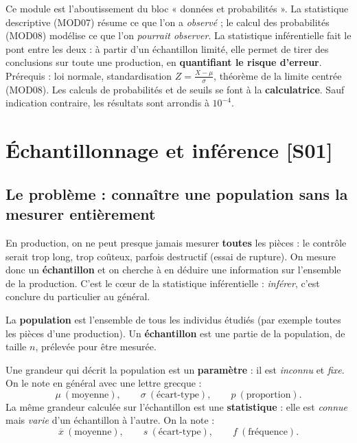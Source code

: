 \documentclass[a4paper,11pt]{article}
\begin{document}
\begin{remarque}
Ce module est l'aboutissement du bloc « données et probabilités ». La statistique descriptive (MOD07) résume ce que l'on a \emph{observé} ; le calcul des probabilités (MOD08) modélise ce que l'on \emph{pourrait observer}. La statistique inférentielle fait le pont entre les deux : à partir d'un échantillon limité, elle permet de tirer des conclusions sur toute une production, en \textbf{quantifiant le risque d'erreur}. Prérequis : loi normale, standardisation $Z = \frac{X-\mu}{\sigma}$, théorème de la limite centrée (MOD08). Les calculs de probabilités et de seuils se font à la \textbf{calculatrice}. Sauf indication contraire, les résultats sont arrondis à $10^{-4}$.
\end{remarque}

\newpage
\tableofcontents
\newpage

\section{Échantillonnage et inférence \hfill {\normalsize\color{uimmred}[S01]}}

\subsection{Le problème : connaître une population sans la mesurer entièrement}

En production, on ne peut presque jamais mesurer \textbf{toutes} les pièces : le contrôle serait trop long, trop coûteux, parfois destructif (essai de rupture). On mesure donc un \textbf{échantillon} et on cherche à en déduire une information sur l'ensemble de la production. C'est le cœur de la statistique inférentielle : \emph{inférer}, c'est conclure du particulier au général.

\begin{definition}
La \textbf{population} est l'ensemble de tous les individus étudiés (par exemple toutes les pièces d'une production). Un \textbf{échantillon} est une partie de la population, de taille $n$, prélevée pour être mesurée.

Une grandeur qui décrit la population est un \textbf{paramètre} : il est \emph{inconnu} et \emph{fixe}. On le note en général avec une lettre grecque :
\[
\mu \ (\text{moyenne}), \qquad \sigma \ (\text{écart-type}), \qquad p \ (\text{proportion}).
\]
La même grandeur calculée sur l'échantillon est une \textbf{statistique} : elle est \emph{connue} mais \emph{varie} d'un échantillon à l'autre. On la note :
\[
\overline{x} \ (\text{moyenne}), \qquad s \ (\text{écart-type}), \qquad f \ (\text{fréquence}).
\]
\end{definition}
\end{document}
